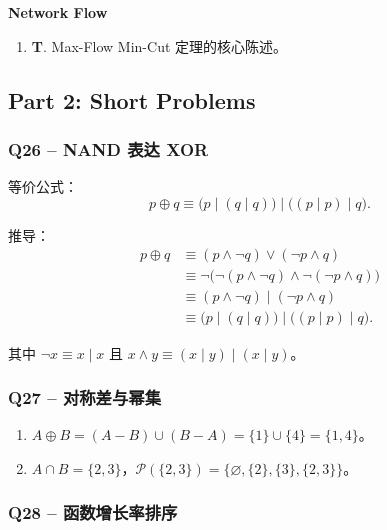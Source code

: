\documentclass[11pt,a4paper,fontset=mac]{ctexart}
\begin{document}
\medskip
\noindent\textbf{Network Flow}
\begin{enumerate}[leftmargin=*,label={\textbf{Q\arabic*}.},wide,itemsep=0pt,start=25]

\item[\textbf{Q25}] \textbf{T}.  Max-Flow Min-Cut 定理的核心陈述。

\end{enumerate}

\subsection*{Part 2: Short Problems}

\subsubsection*{Q26 \;--\; NAND 表达 XOR}

等价公式：
\[
p\oplus q \equiv \bigl(p\mid(q\mid q)\bigr)\mid\bigl((p\mid p)\mid q\bigr).
\]

推导：
\[
\begin{aligned}
p\oplus q &\equiv (p\land\neg q)\lor(\neg p\land q) \\
&\equiv \neg\bigl(\neg(p\land\neg q)\land\neg(\neg p\land q)\bigr) \\
&\equiv (p\land\neg q)\mid(\neg p\land q) \\
&\equiv \bigl(p\mid(q\mid q)\bigr)\mid\bigl((p\mid p)\mid q\bigr).
\end{aligned}
\]

其中 $\neg x\equiv x\mid x$ 且 $x\land y\equiv (x\mid y)\mid(x\mid y)$。

\subsubsection*{Q27 \;--\; 对称差与幂集}

\begin{enumerate}[label=(\alph*)]
  \item $A\oplus B = (A-B)\cup(B-A) = \{1\}\cup\{4\} = \{1,4\}$。
  \item $A\cap B = \{2,3\}$，$\mathcal{P}(\{2,3\}) = \{\varnothing,\{2\},\{3\},\{2,3\}\}$。
\end{enumerate}

\subsubsection*{Q28 \;--\; 函数增长率排序}
\end{document}
